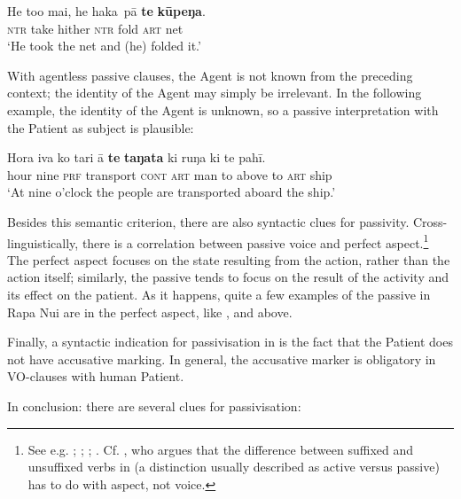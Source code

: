 
\ea\label{ex:8.57}
\gll He to{\ꞌ}o mai, he haka~pā \textbf{te} \textbf{kūpeŋa}. \\
\textsc{ntr} take hither \textsc{ntr} fold \textsc{art} net \\

\glt
‘He took the net and (he) folded it.’ \textstyleExampleref{[Mtx-3-01.171]}
\z

With agentless passive clauses, the Agent is not known from the preceding context; the identity of the Agent may simply be irrelevant. In the following example, the identity of the Agent is unknown, so a passive interpretation with the Patient as subject is plausible:

\ea\label{ex:8.58}
\gll Hora iva ko tari {\ꞌ}ā \textbf{te} \textbf{taŋata} ki ruŋa ki te pahī.\\
hour nine \textsc{prf} transport \textsc{cont} \textsc{art} man to above to \textsc{art} ship\\

\glt
‘At nine o’clock the people are transported aboard the ship.’ \textstyleExampleref{[R210.037]} 
\z

Besides this semantic criterion, there are also syntactic clues for passivity. Cross-linguistically, there is a correlation between passive voice and perfect aspect.\footnote{\label{fn:415}See e.g. \citet[84]{Comrie1976}; \citet[382]{Foley2007}; \citet[340]{KeenanDryer2007}; \citet[219]{Dixon2012}. Cf. \citet{Milner1973}, who argues that the difference between suffixed and unsuffixed verbs in  (a distinction usually described as active versus passive) has to do with aspect, not voice.} The perfect aspect focuses on the state resulting from the action, rather than the action itself; similarly, the passive tends to focus on the result of the activity and its effect on the patient. As it happens, quite a few examples of the passive in Rapa Nui are in the perfect aspect, like ,  and  above.

Finally, a syntactic indication for passivisation in  is the fact that the Patient does not have accusative marking. In general, the accusative marker is obligatory in VO-clauses with human Patient.

\newpage 
In conclusion: there are several clues for passivisation:

